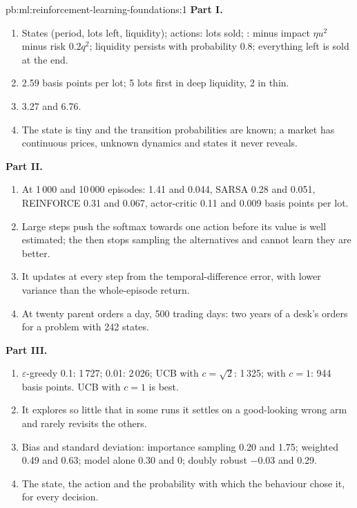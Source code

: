 \begin{solution}{pb:ml:reinforcement-learning-foundations:1}
\textbf{Part I.}
\begin{enumerate}
\item States (period, lots left, liquidity); actions: lots sold; : minus impact $\eta u^2$ minus risk $0.2q^2$;
liquidity persists with probability 0.8; everything left is sold at the end.
\item 2.59 basis points per lot; 5 lots first in deep liquidity, 2 in thin.
\item 3.27 and 6.76.
\item The state is tiny and the transition probabilities are known; a market has continuous prices, unknown dynamics and
states it never reveals.
\end{enumerate}
\textbf{Part II.}
\begin{enumerate}[resume]
\item At 1\,000 and 10\,000 episodes:  1.41 and 0.044, SARSA 0.28 and 0.051, REINFORCE 0.31 and 0.067, actor-critic
0.11 and 0.009 basis points per lot.
\item Large steps push the softmax towards one action before its value is well estimated; the  then stops sampling the
alternatives and cannot learn they are better.
\item It updates at every step from the temporal-difference error, with lower variance than the whole-episode return.
\item At twenty parent orders a day, 500 trading days: two years of a desk's orders for a problem with 242 states.
\end{enumerate}
\textbf{Part III.}
\begin{enumerate}[resume]
\item $\varepsilon$-greedy 0.1: 1\,727; 0.01: 2\,026; UCB with $c = \sqrt2$: 1\,325; with $c = 1$: 944 basis points. UCB with
$c = 1$ is best.
\item It explores so little that in some runs it settles on a good-looking wrong arm and rarely revisits the others.
\item Bias and standard deviation: importance sampling 0.20 and 1.75; weighted 0.49 and 0.63; model alone 0.30 and 0; doubly
robust $-0.03$ and 0.29.
\item The state, the action and the probability with which the behaviour  chose it, for every decision.

\end{enumerate}
\end{solution}
